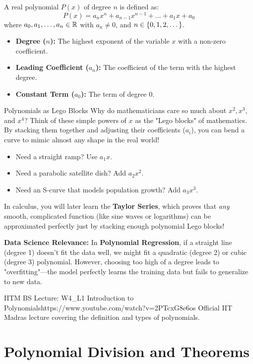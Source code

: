 A real polynomial $P(x)$ of degree $n$ is defined as:
$$P(x) = a_n x^n + a_{n-1} x^{n-1} + \dots + a_1 x + a_0$$
where $a_0, a_1, \dots, a_n \in \mathbb{R}$ with $a_n \neq 0$, and $n \in \left\{0, 1, 2, \dots\right\}$.

\begin{itemize}
    \item \textbf{Degree ($n$):} The highest exponent of the variable $x$ with a non-zero coefficient.
    \item \textbf{Leading Coefficient ($a_n$):} The coefficient of the term with the highest degree.
    \item \textbf{Constant Term ($a_0$):} The term of degree $0$.
\end{itemize}

\begin{intuitionbox}{Polynomials as Lego Blocks}
Why do mathematicians care so much about $x^2, x^3$, and $x^4$? 
Think of these simple powers of $x$ as the "Lego blocks" of mathematics. By stacking them together and adjusting their coefficients ($a_i$), you can bend a curve to mimic almost any shape in the real world!
\begin{itemize}
    \item Need a straight ramp? Use $a_1 x$.
    \item Need a parabolic satellite dish? Add $a_2 x^2$.
    \item Need an S-curve that models population growth? Add $a_3 x^3$.
\end{itemize}
In calculus, you will later learn the \textbf{Taylor Series}, which proves that \textit{any} smooth, complicated function (like sine waves or logarithms) can be approximated perfectly just by stacking enough polynomial Lego blocks!
\end{intuitionbox}

\textbf{Data Science Relevance:} In \textbf{Polynomial Regression}, if a straight line (degree 1) doesn't fit the data well, we might fit a quadratic (degree 2) or cubic (degree 3) polynomial. However, choosing too high of a degree leads to "overfitting"—the model perfectly learns the training data but fails to generalize to new data.

\begin{videocard}{IITM BS Lecture: W4\_L1 Introduction to Polynomials}{https://www.youtube.com/watch?v=2PTcxG8e6os}
Official IIT Madras lecture covering the definition and types of polynomials.
\end{videocard}

\section{Polynomial Division and Theorems}

